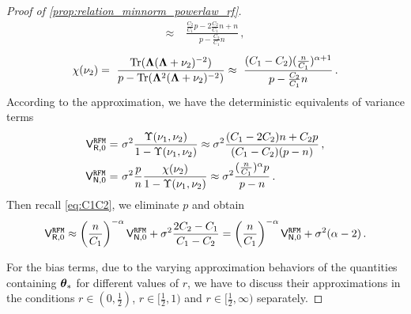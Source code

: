\begin{proof}[Proof of \cref{prop:relation_minnorm_powerlaw_rf}]
\[\begin{aligned}
\approx&~ \frac{\frac{C_2}{C_1}p -2 \frac{C_2}{C_1} n + n}{p - \frac{C_2}{C_1}n}\,,
\end{aligned}
\]
\[
\begin{aligned}
\chi(\nu_2) =~ \frac{{\rm Tr}({\boldsymbol \Lambda} ({\boldsymbol \Lambda} + \nu_2)^{-2})}{p - {\rm Tr}({\boldsymbol \Lambda}^2 ({\boldsymbol \Lambda} + \nu_2)^{-2})} \approx~ \frac{(C_1-C_2)(\frac{n}{C_1})^{\alpha+1}}{p-\frac{C_2}{C_1}n}\,.
\end{aligned}
\]
According to the approximation, we have the deterministic equivalents of variance terms
\[
\begin{aligned}
\mathsf V_{\mathsf R,0}^{\tt RFM} =&~ \sigma^2 \frac{\Upsilon(\nu_1, \nu_2)}{1 - \Upsilon(\nu_1, \nu_2)} \approx \sigma^2 \frac{(C_1-2C_2)n + C_2p}{(C_1-C_2)(p-n)}\,,\\
\mathsf V_{\mathsf N,0}^{\tt RFM} =&~ \sigma^2 \frac{p}{n} \frac{\chi(\nu_2)}{1 - \Upsilon(\nu_1, \nu_2)} \approx \sigma^2 \frac{(\frac{n}{C_1})^\alpha p}{p-n}\,.
\end{aligned}
\]
Then recall \cref{eq:C1C2}, we eliminate $p$ and obtain
\begin{equation}\label{eq:V_over_power_law}
    \mathsf V_{\mathsf R,0}^{\tt RFM} \approx \left(\frac{n}{C_1}\right)^{-\alpha}\mathsf V_{\mathsf N,0}^{\tt RFM} + \sigma^2\frac{2C_2-C_1}{C_1-C_2} = \left(\frac{n}{C_1}\right)^{-\alpha}\mathsf V_{\mathsf N,0}^{\tt RFM} + \sigma^2(\alpha - 2)\,.
\end{equation}

For the bias terms, due to the varying approximation behaviors of the quantities containing ${\boldsymbol \theta}_*$ for different values of $r$, we have to discuss their approximations in the conditions $r \in (0, \frac{1}{2})$, $r \in [\frac{1}{2}, 1)$ and $r \in [\frac{1}{2}, \infty)$ separately.


\end{proof}
